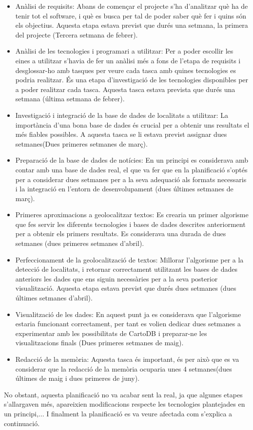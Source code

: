 \documentclass[12pt,a4paper,openright,oneside]{article}
\numberwithin{equation}{section}
\theoremstyle{definition}
\begin{document}
\begin{itemize}
\item Anàlisi de requisits: Abans de començar el projecte s'ha d'analitzar què ha de tenir tot el software, i què es busca per tal de poder saber què fer i quins són els objectius. Aquesta etapa estava previst que durés una setmana, la primera del projecte (Tercera setmana de febrer).
\item Anàlisi de les tecnologies i programari a utilitzar: Per a poder escollir les eines a utilitzar s'havia de fer un anàlisi més a fons de l'etapa de requisits i desglossar-ho amb tasques per veure cada tasca amb quines tecnologies es podria realitzar. És una etapa d'investigació de les tecnologies disponibles per a poder realitzar cada tasca. Aquesta tasca estava prevista que durés una setmana (última setmana de febrer).
\item Investigació i integració de la base de dades de localitats a utilitzar: La importància d'una bona base de dades és crucial per a obtenir uns resultats el més fiables possibles. A aquesta tasca se li estava previst assignar dues setmanes(Dues primeres setmanes de març).
\item Preparació de la base de dades de notícies: En un principi es considerava amb contar amb una base de dades real, el que va fer que en la planificació s'optés per a considerar dues setmanes per a la seva adequació als formats necessaris i la integració en l'entorn de desenvolupament (dues últimes setmanes de març).
\item Primeres aproximacions a geolocalitzar textos: Es crearia un primer algorisme que fes servir les diferents tecnologies i bases de dades descrites anteriorment per a obtenir els primers resultats. Es considerava una durada de dues setmanes (dues primeres setmanes d'abril).
\item Perfeccionament de la geolocalització de textos: Millorar l'algorisme per a la detecció de localitats, i retornar correctament utilitzant les bases de dades anteriors les dades que ens siguin necessàries per a la seva posterior visualització. Aquesta etapa estava previst que durés dues setmanes (dues últimes setmanes d'abril).
\item Visualització de les dades: En aquest punt ja es considerava que l'algorisme estaria funcionant correctament, per tant es volien dedicar dues setmanes a experimentar amb les possibilitats de CartoDB i preparar-ne les visualitzacions finals (Dues primeres setmanes de maig).
\item Redacció de la memòria: Aquesta tasca és important, és per això que es va considerar que la redacció de la memòria ocuparia unes 4 setmanes(dues últimes de maig i dues primeres de juny).
\end{itemize}
No obstant, aquesta planificació no va acabar sent la real, ja que algunes etapes s'allargaven més, apareixien modificacions respecte les tecnologies plantejades en un principi,... I finalment la planificació es va veure afectada com s'explica a continuació.
\end{document}
